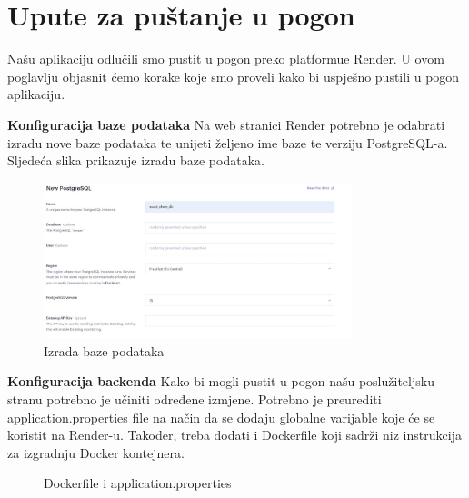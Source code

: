 			\eject 
		
		\section{Upute za puštanje u pogon}
		\indent Našu aplikaciju odlučili smo pustit u pogon preko platformue Render. U ovom poglavlju objasnit ćemo korake koje smo proveli kako bi uspješno pustili u pogon aplikaciju.\newline
	
		\textbf{Konfiguracija baze podataka}\newline
		Na web stranici Render potrebno je odabrati izradu nove baze podataka te unijeti željeno ime baze te verziju PostgreSQL-a. Sljedeća slika prikazuje izradu baze podataka.
		\begin{figure}[h]
			\centering
			\includegraphics[width=0.8\textwidth]{slike/pustanju_u_pogon_1.jpg}
			\caption{Izrada baze podataka}
			\label{fig:baza podataka}
		\end{figure}
		
		
		\textbf{Konfiguracija backenda}\newline
		Kako bi mogli pustit u pogon našu poslužiteljsku stranu potrebno je učiniti određene izmjene. Potrebno je preurediti application.properties file na način da se dodaju globalne varijable koje će se koristit na Render-u. Također, treba dodati i Dockerfile koji sadrži niz instrukcija za izgradnju Docker kontejnera. 
		
		\begin{figure}
			\centering
			\caption{Dockerfile i application.properties}
			\label{fig:dockerfile_application.properties}
		\end{figure}
		
